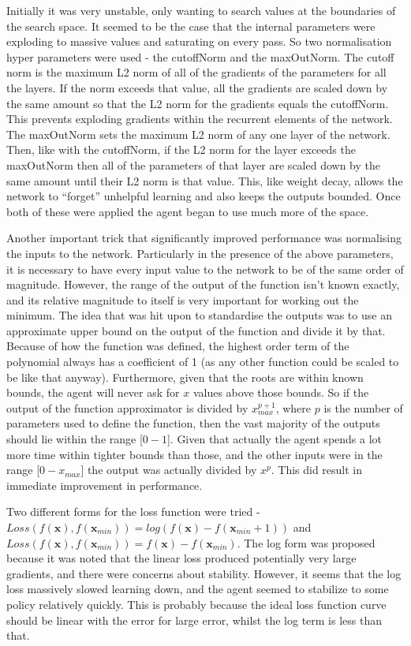 Initially it was very unstable, only wanting to search values at the boundaries of the search space. It seemed to be the case that the internal parameters were exploding to massive values and saturating on every pass. So two normalisation hyper parameters were used - the cutoffNorm and the maxOutNorm. The cutoff norm is the maximum L2 norm of all of the gradients of the parameters for all the layers. If the norm exceeds that value, all the gradients are scaled down by the same amount so that the L2 norm for the gradients equals the cutoffNorm. This prevents exploding gradients within the recurrent elements of the network. The maxOutNorm sets the maximum L2 norm of any one layer of the network. Then, like with the cutoffNorm, if the L2 norm for the layer exceeds the maxOutNorm then all of the parameters of that layer are scaled down by the same amount until their L2 norm is that value. This, like weight decay, allows the network to ``forget'' unhelpful learning and also keeps the outputs bounded. Once both of these were applied the agent began to use much more of the space.

Another important trick that significantly improved performance was normalising the inputs to the network. Particularly in the presence of the above parameters, it is necessary to have every input value to the network to be of the same order of magnitude. However, the range of the output of the function isn't known exactly, and its relative magnitude to itself is very important for working out the minimum. The idea that was hit upon to standardise the outputs was to use an approximate upper bound on the output of the function and divide it by that. Because of how the function was defined, the highest order term of the polynomial always has a coefficient of 1 (as any other function could be scaled to be like that anyway). Furthermore, given that the roots are within known bounds, the agent will never ask for $x$ values above those bounds. So if the output of the function approximator is divided by $x_{max}^{p+1}$, where $p$ is the number of parameters used to define the function, then the vast majority of the outputs should lie within the range [$0 - 1$]. Given that actually the agent spends a lot more time within tighter bounds than those, and the other inputs were in the range [$0- x_{max} $] the output was actually divided by $x^p$. This did result in immediate improvement in performance.

Two different forms for the loss function were tried - $Loss(f(\boldsymbol{x}), f(\boldsymbol{x}_{min})) = log(f(\boldsymbol{x}) - f(\boldsymbol{x}_{min} +1))$ and $Loss(f(\boldsymbol{x}), f(\boldsymbol{x}_{min})) = f(\boldsymbol{x}) - f(\boldsymbol{x}_{min})$. The log form was proposed because it was noted that the linear loss produced potentially very large gradients, and there were concerns about stability. However, it seems that the log loss massively slowed learning down, and the agent seemed to stabilize to some policy relatively quickly. This is probably because the ideal loss function curve should be linear with the error for large error, whilst the log term is less than that.

